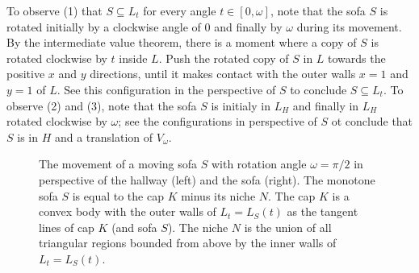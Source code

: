 To observe (1) that \(S \subseteq L_t\) for every angle \(t \in [0, \omega]\), note that the sofa \(S\) is rotated initially by a clockwise angle of \(0\) and finally by \(\omega\) during its movement. By the intermediate value theorem, there is a moment where a copy of \(S\) is rotated clockwise by \(t\) inside \(L\). Push the rotated copy of \(S\) in \(L\) towards the positive \(x\) and \(y\) directions, until it makes contact with the outer walls \(x=1\) and \(y=1\) of \(L\). See this configuration in the perspective of \(S\) to conclude \(S \subseteq L_t\). To observe (2) and (3), note that the sofa \(S\) is initialy in \(L_H\) and finally in \(L_H\) rotated clockwise by \(\omega\); see the configurations in perspective of \(S\) ot conclude that \(S\) is in \(H\) and a translation of \(V_\omega\).

\begin{figure}
\centering

\caption{The movement of a moving sofa \(S\) with rotation angle \(\omega = \pi/2\) in perspective of the hallway (left) and the sofa (right). The monotone sofa \(S\) is equal to the cap \(K\) minus its niche \(N\). The cap \(K\) is a convex body with the outer walls of \(L_t = L_S(t)\) as the tangent lines of cap \(K\) (and sofa \(S\)). The niche \(N\) is the union of all triangular regions bounded from above by the inner walls of \(L_t = L_S(t)\).}
\label{fig:monotone-sofa}
\end{figure}

